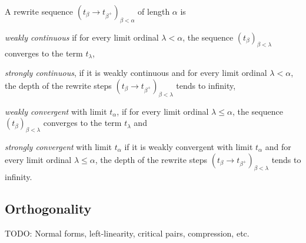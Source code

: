 \begin{definition}%
A rewrite sequence $(t_\beta \rightarrow t_{\beta^+})_{\beta < \alpha}$ of
length $\alpha$ is
\begin{compactenum}
  \item
    \emph{weakly continuous} if for every limit ordinal $\lambda < \alpha$,
    the sequence $(t_\beta)_{\beta < \lambda}$ converges to the term
    $t_\lambda$,
  \item
    \emph{strongly continuous}, if it is weakly continuous and for every limit
    ordinal $\lambda < \alpha$, the depth of the rewrite steps $(t_\beta
    \rightarrow t_{\beta^+})_{\beta < \lambda}$ tends to infinity,
  \item
    \emph{weakly convergent} with limit $t_\alpha$, if for every limit ordinal
    $\lambda \leq \alpha$, the sequence $(t_\beta)_{\beta < \lambda}$
    converges to the term $t_\lambda$ and
  \item
    \emph{strongly convergent} with limit $t_\alpha$ if it is weakly
    convergent with limit $t_\alpha$ and for every limit ordinal $\lambda \leq
    \alpha$, the depth of the rewrite steps $(t_\beta \rightarrow
    t_{\beta^+})_{\beta < \lambda}$ tends to infinity.
\end{compactenum}
\end{definition}


\subsection{Orthogonality}

TODO: Normal forms, left-linearity, critical pairs, compression, etc.
